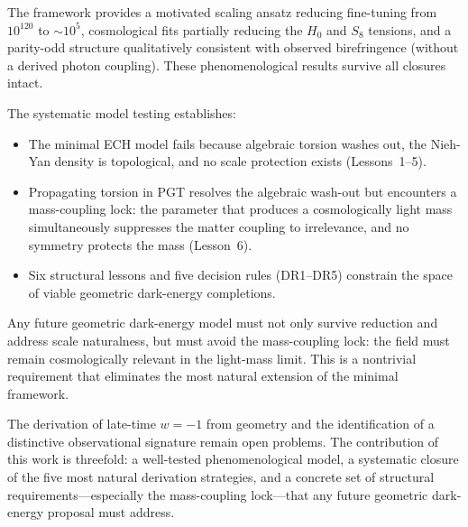 \documentclass[aps,prd,twocolumn,superscriptaddress,showpacs,preprintnumbers,
  nofootinbib,longbibliography,floatfix]{revtex4-2}
\begin{document}
The framework provides a motivated scaling ansatz reducing fine-tuning
from $10^{120}$ to $\sim\!10^5$, cosmological fits partially reducing
the $H_0$ and $S_8$ tensions, and a parity-odd structure qualitatively
consistent with observed birefringence (without a derived photon
coupling). These phenomenological results survive all closures intact.

The systematic model testing establishes:
\begin{itemize}[leftmargin=*]
  \item The minimal ECH model fails because algebraic torsion washes
    out, the Nieh-Yan density is topological, and no scale protection
    exists (Lessons~1--5).
  \item Propagating torsion in PGT resolves the algebraic wash-out but
    encounters a mass-coupling lock: the parameter that produces a
    cosmologically light mass simultaneously suppresses the matter
    coupling to irrelevance, and no symmetry protects the mass
    (Lesson~6).
  \item Six structural lessons and five decision rules (DR1--DR5)
    constrain the space of viable geometric dark-energy completions.
\end{itemize}

Any future geometric dark-energy model must not only survive reduction
and address scale naturalness, but must avoid the mass-coupling lock:
the field must remain cosmologically relevant in the light-mass limit.
This is a nontrivial requirement that eliminates the most natural
extension of the minimal framework.

The derivation of late-time $w = -1$ from geometry and the identification
of a distinctive observational signature remain open problems. The
contribution of this work is threefold: a well-tested phenomenological
model, a systematic closure of the five most natural derivation
strategies, and a concrete set of structural requirements---especially
the mass-coupling lock---that any future geometric dark-energy proposal
must address.


\begin{acknowledgments}
\end{acknowledgments}


\appendix
\end{document}
